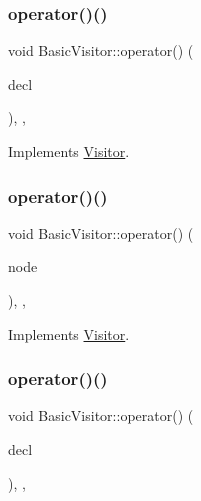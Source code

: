 \subsubsection{\texorpdfstring{operator()()}{operator()()}\hspace{0.1cm}{\footnotesize\ttfamily [44/60]}}
{\footnotesize\ttfamily void Basic\+Visitor\+::operator() (\begin{DoxyParamCaption}\item[{const \hyperlink{struct_function_declaration}{Function\+Declaration} \&}]{decl }\end{DoxyParamCaption})\hspace{0.3cm}{\ttfamily [inline]}, {\ttfamily [override]}, {\ttfamily [virtual]}}



Implements \hyperlink{struct_visitor_aa4450ebee6fecf69499279c0768282f1}{Visitor}.

\mbox{\label{struct_basic_visitor_ac9435a48d44ce32bd726cbf46bcc9032}} 
\subsubsection{\texorpdfstring{operator()()}{operator()()}\hspace{0.1cm}{\footnotesize\ttfamily [45/60]}}
{\footnotesize\ttfamily void Basic\+Visitor\+::operator() (\begin{DoxyParamCaption}\item[{const \hyperlink{struct_function_body}{Function\+Body} \&}]{node }\end{DoxyParamCaption})\hspace{0.3cm}{\ttfamily [inline]}, {\ttfamily [override]}, {\ttfamily [virtual]}}



Implements \hyperlink{struct_visitor_a72bb7e5f0b3bd7ebc8e30f5903a5c5f2}{Visitor}.

\mbox{\label{struct_basic_visitor_a0405c0df4a21c4735feaa98f5cd0cfa9}} 
\subsubsection{\texorpdfstring{operator()()}{operator()()}\hspace{0.1cm}{\footnotesize\ttfamily [46/60]}}
{\footnotesize\ttfamily void Basic\+Visitor\+::operator() (\begin{DoxyParamCaption}\item[{const \hyperlink{struct_variable_declaration}{Variable\+Declaration} \&}]{decl }\end{DoxyParamCaption})\hspace{0.3cm}{\ttfamily [inline]}, {\ttfamily [override]}, {\ttfamily [virtual]}}



